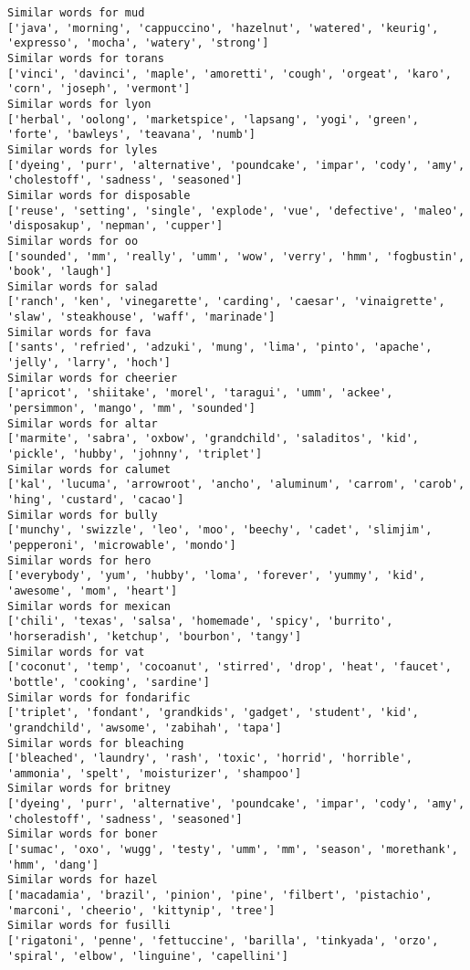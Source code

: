 \documentclass[11pt]{article}
\begin{document}
\begin{Verbatim}[commandchars=\\\{\}]
Similar words for mud
['java', 'morning', 'cappuccino', 'hazelnut', 'watered', 'keurig', 'expresso', 'mocha', 'watery', 'strong']
Similar words for torans
['vinci', 'davinci', 'maple', 'amoretti', 'cough', 'orgeat', 'karo', 'corn', 'joseph', 'vermont']
Similar words for lyon
['herbal', 'oolong', 'marketspice', 'lapsang', 'yogi', 'green', 'forte', 'bawleys', 'teavana', 'numb']
Similar words for lyles
['dyeing', 'purr', 'alternative', 'poundcake', 'impar', 'cody', 'amy', 'cholestoff', 'sadness', 'seasoned']
Similar words for disposable
['reuse', 'setting', 'single', 'explode', 'vue', 'defective', 'maleo', 'disposakup', 'nepman', 'cupper']
Similar words for oo
['sounded', 'mm', 'really', 'umm', 'wow', 'verry', 'hmm', 'fogbustin', 'book', 'laugh']
Similar words for salad
['ranch', 'ken', 'vinegarette', 'carding', 'caesar', 'vinaigrette', 'slaw', 'steakhouse', 'waff', 'marinade']
Similar words for fava
['sants', 'refried', 'adzuki', 'mung', 'lima', 'pinto', 'apache', 'jelly', 'larry', 'hoch']
Similar words for cheerier
['apricot', 'shiitake', 'morel', 'taragui', 'umm', 'ackee', 'persimmon', 'mango', 'mm', 'sounded']
Similar words for altar
['marmite', 'sabra', 'oxbow', 'grandchild', 'saladitos', 'kid', 'pickle', 'hubby', 'johnny', 'triplet']
Similar words for calumet
['kal', 'lucuma', 'arrowroot', 'ancho', 'aluminum', 'carrom', 'carob', 'hing', 'custard', 'cacao']
Similar words for bully
['munchy', 'swizzle', 'leo', 'moo', 'beechy', 'cadet', 'slimjim', 'pepperoni', 'microwable', 'mondo']
Similar words for hero
['everybody', 'yum', 'hubby', 'loma', 'forever', 'yummy', 'kid', 'awesome', 'mom', 'heart']
Similar words for mexican
['chili', 'texas', 'salsa', 'homemade', 'spicy', 'burrito', 'horseradish', 'ketchup', 'bourbon', 'tangy']
Similar words for vat
['coconut', 'temp', 'cocoanut', 'stirred', 'drop', 'heat', 'faucet', 'bottle', 'cooking', 'sardine']
Similar words for fondarific
['triplet', 'fondant', 'grandkids', 'gadget', 'student', 'kid', 'grandchild', 'awsome', 'zabihah', 'tapa']
Similar words for bleaching
['bleached', 'laundry', 'rash', 'toxic', 'horrid', 'horrible', 'ammonia', 'spelt', 'moisturizer', 'shampoo']
Similar words for britney
['dyeing', 'purr', 'alternative', 'poundcake', 'impar', 'cody', 'amy', 'cholestoff', 'sadness', 'seasoned']
Similar words for boner
['sumac', 'oxo', 'wugg', 'testy', 'umm', 'mm', 'season', 'morethank', 'hmm', 'dang']
Similar words for hazel
['macadamia', 'brazil', 'pinion', 'pine', 'filbert', 'pistachio', 'marconi', 'cheerio', 'kittynip', 'tree']
Similar words for fusilli
['rigatoni', 'penne', 'fettuccine', 'barilla', 'tinkyada', 'orzo', 'spiral', 'elbow', 'linguine', 'capellini']

\end{Verbatim}
\end{document}
